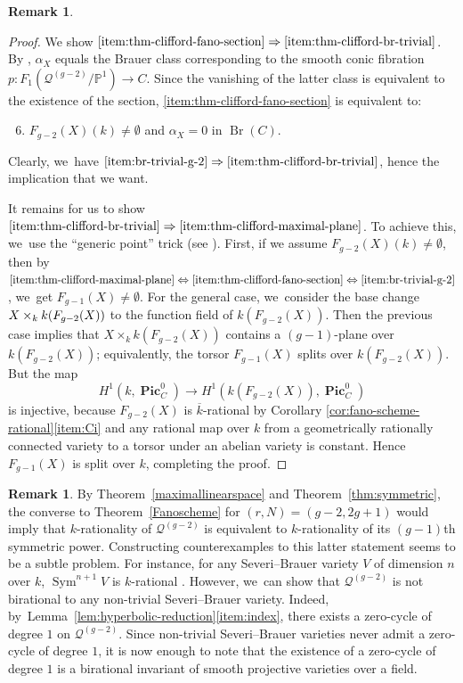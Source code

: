 \documentclass[JEP,XML,SOM,Unicode,NoEqCountersInSection,published]{cedram}
\theoremstyle{plain}
\theoremstyle{definition}
\newtheorem{rem}[thm]{Remark}
\DeclareMathOperator{\Br}{Br}
\DeclareMathOperator{\bPic}{\mathbf{Pic}}
\DeclareMathOperator{\Sym}{Sym}
\newcommand{\kbar}{{\overline{k}}}
\renewcommand\P{\mathbb{P}}
\begin{document}
\begin{rem}
\begin{proof}
We show $\eqref{item:thm-clifford-fano-section}\Rightarrow\eqref{item:thm-clifford-br-trivial}$.
By \cite[Prop.\,B.6]{ABB14},
$\alpha_X$ equals the Brauer class corresponding to the smooth conic fibration $p\colon F_1(\mathcal{Q}^{(g-2)}/\P^1)\to C$.
Since the vanishing of the latter class is equivalent to the existence of the section, \eqref{item:thm-clifford-fano-section} is equivalent to:
\begin{enumerate}
\setcounter{enumi}{5}
\item\label{item:br-trivial-g-2} $F_{g-2}(X)(k)\neq \emptyset$ and $\alpha_X=0$ in $\Br(C)$.
\end{enumerate}
Clearly, we~have $\eqref{item:br-trivial-g-2}\Rightarrow\eqref{item:thm-clifford-br-trivial}$,
hence the implication that we want.

It remains for us to show $\eqref{item:thm-clifford-br-trivial}\Rightarrow\eqref{item:thm-clifford-maximal-plane}$.
To achieve this, we~use the ``generic point'' trick (see \cite[Th.\,5.10]{CT-intersection-quadrics}).
First,
if we assume \(F_{g-2}(X)(k)\neq\emptyset\),
then
by \hbox{$\eqref{item:thm-clifford-maximal-plane}\Leftrightarrow\eqref{item:thm-clifford-fano-section}\Leftrightarrow\eqref{item:br-trivial-g-2}$}, we~get $F_{g-1}(X)\neq \emptyset$.
For the general case, we~consider the base change \(X\times_k\nobreak k(F_{g-2}(X))\) to the function field of \(k(F_{g-2}(X))\). Then the previous case implies that \(X\times_k k(F_{g-2}(X))\) contains a \((g-1)\)-plane over \(k(F_{g-2}(X))\); equivalently, the torsor \(F_{g-1}(X)\) splits over \(k(F_{g-2}(X))\).
But the map
\[
H^1(k, \bPic^0_C) \to H^1(k(F_{g-2}(X)), \bPic^0_C)
\]
is injective,
because \(F_{g-2}(X)\) is $\kbar$-rational by Corollary \ref{cor:fano-scheme-rational}\eqref{item:Ci} and any rational map over $k$ from a geometrically rationally connected variety to a torsor under an abelian variety is constant.
Hence \(F_{g-1}(X)\) is split over \(k\), completing the proof.
\end{proof}
\end{rem}

\begin{rem}\label{rem:sym-rational}
By Theorem~\ref{maximallinearspace} and Theorem~\ref{thm:symmetric},
the converse to Theorem~\ref{Fanoscheme} for $(r, N)=(g-2, 2g+1)$ would imply that $k$\nobreakdash-rationality of $\mathcal{Q}^{(g-2)}$ is equivalent to $k$\nobreakdash-rationality of its \((g-1)\)th symmetric power.
Constructing counterexamples to this latter statement seems to be
a subtle problem.
For instance, for any Severi--Brauer variety $V$ of dimension $n$ over $k$, $\Sym^{n+1}V$ is $k$\nobreakdash-rational \cite[Th.\,1.4]{KrashenSaltman}.
However, we~can show that $\mathcal{Q}^{(g-2)}$
is not birational to any non-trivial Severi--Brauer variety.
Indeed, by~Lemma~\ref{lem:hyperbolic-reduction}\eqref{item:index},
there exists a zero-cycle of degree $1$ on
$\mathcal{Q}^{(g-2)}$.
Since non-trivial Severi--Brauer varieties never admit a zero-cycle of degree $1$, it is now enough to note that the existence of a zero-cycle of degree $1$ is a birational invariant of smooth projective varieties over a field.
\end{rem}
\end{document}
